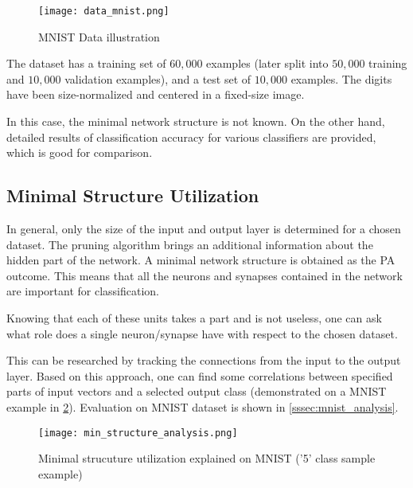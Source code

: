 \begin{figure}[H]
  \centering
  \texttt{[image: data\_mnist.png]}
  \caption{MNIST Data illustration \citep{online:mnist}}
  \label{img:data_mnist}
\end{figure}

The dataset has a training set of $ 60,000 $ examples (later split into $ 50,000 $ training and $ 10,000 $ validation examples), and a test set of $ 10,000 $ examples. The digits have been size-normalized and centered in a fixed-size image.

In this case, the minimal network structure is not known. On the other hand, detailed results of classification accuracy for various classifiers are provided, which is good for comparison.

\subsection{Minimal Structure Utilization} \label{ssec:minimal_structure_util}
In general, only the size of the input and output layer is determined for a chosen dataset. The pruning algorithm brings an additional information about the hidden part of the network. A minimal network structure is obtained as the PA outcome. This means that all the neurons and synapses contained in the network are important for classification.

Knowing that each of these units takes a part and is not useless, one can ask what role does a single neuron/synapse have with respect to the chosen dataset.

This can be researched by tracking the connections from the input to the output layer. Based on this approach, one can find some correlations between specified parts of input vectors and a selected output class (demonstrated on a MNIST example in \cref{img:structure_util}). Evaluation on MNIST dataset is shown in \cref{sssec:mnist_analysis}.

\begin{figure}[H]
  \centering
  \texttt{[image: min\_structure\_analysis.png]}
  \caption{Minimal strucuture utilization explained on MNIST ('5' class sample example)}
  \label{img:structure_util}
\end{figure}